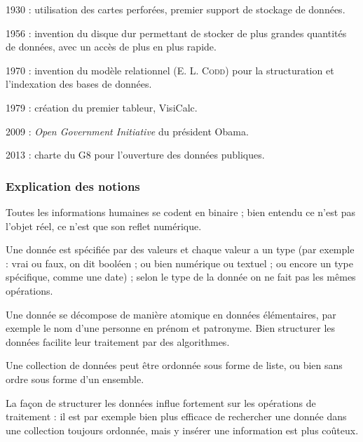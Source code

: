 \begin{tcolorbox}[title={Repères historiques}, toprule=0pt, leftrule=0pt, rightrule=0pt, arc=0pt,
                  fonttitle=\scshape\boxtitlefont,
                  colbacktitle=white, coltitle=firstcolor, colframe=firstcolor, colback=firstcolor!10,
                  breakable, enhanced jigsaw]
\begin{jazzitemize}
\item 1930 : utilisation des cartes perforées, premier support de stockage de  données.
\item 1956 : invention du disque dur permettant de stocker de plus grandes  quantités de données, avec un accès de plus en plus rapide.
\item 1970 : invention du modèle relationnel (E. L. \textsc{Codd}) pour la structuration et l’indexation des bases de données. 
\item 1979 : création du premier tableur, VisiCalc.
\item 2009 : \textit{Open Government Initiative} du président Obama.
\item 2013 : charte du G8 pour l’ouverture des données publiques.
\end{jazzitemize}
\end{tcolorbox}

\subsubsection[Explication des notions]{Explication des notions}
\label{subsub:VIII.1.1.3}


\begin{jazzitemize}
\item Toutes les informations humaines se codent en binaire ; bien entendu ce n'est pas l'objet réel, ce n'est que son reflet numérique.
\item Une donnée est spécifiée par des valeurs et chaque valeur a un type (par exemple : vrai ou faux, on dit booléen ; ou bien numérique ou textuel ; ou encore un type spécifique, comme une date) ; selon le type de la donnée on ne fait pas les mêmes opérations.
\item Une donnée se décompose de manière atomique en données élémentaires, par exemple le nom d'une personne en prénom et patronyme. Bien structurer les données facilite leur traitement par des algorithmes.
\item Une collection de données peut être ordonnée sous forme de liste, ou bien sans ordre sous forme d'un ensemble.
\item La façon de structurer les données influe fortement sur les opérations de traitement : il est par exemple bien plus efficace de rechercher une donnée dans une collection toujours ordonnée, mais y insérer une information est plus coûteux.
\end{jazzitemize}

